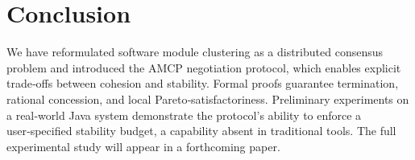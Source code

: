 \documentclass[conference]{IEEEtran}
\begin{document}
\section{Conclusion}
\label{sec:conclusion}
We have reformulated software module clustering as a distributed consensus problem and introduced the AMCP negotiation protocol, which enables explicit trade‑offs between cohesion and stability. Formal proofs guarantee termination, rational concession, and local Pareto‑satisfactoriness. Preliminary experiments on a real‑world Java system demonstrate the protocol's ability to enforce a user‑specified stability budget, a capability absent in traditional tools. The full experimental study will appear in a forthcoming paper.
\balance
{\small

}
\end{document}

